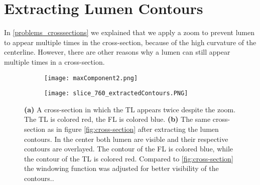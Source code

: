 \documentclass[thesis.tex]{subfiles}
\begin{document}
\section{Extracting Lumen Contours}
\label{section:extracting_contours}
In \ref{problems_crosssections} we explained that we apply a zoom to prevent lumen to appear multiple times in the cross-section, because of the high curvature of the centerline. However, there are other reasons why a lumen can still appear multiple times in a cross-section. 

\begin{figure}
\centering
	\begin{subfigure}[t]{0.454\textwidth}
		\texttt{[image: maxComponent2.png]}
		\caption{}	
		\label{maxComponent}	
	\end{subfigure}
\hspace{0.13\textwidth}
	\begin{subfigure}[t]{0.4\textwidth}
		\texttt{[image: slice\_760\_extractedContours.PNG]}
		
	\caption{}	
\label{fig:extracted_contours}	
	\end{subfigure}

	\caption{\textbf{(a)} A cross-section in which the TL appears twice despite the zoom. The TL is colored red, the FL is colored blue. \textbf{(b)} The same cross-section as in figure \ref{fig:cross-section} after extracting the lumen contours. In the center both lumen are visible and their respective contours are overlayed. The contour of the FL is colored blue, while the contour of the TL is colored red. Compared to \ref{fig:cross-section} the windowing function was adjusted for better visibility of the contours..}
\label{fig:overlapping}
\end{figure}
\end{document}
